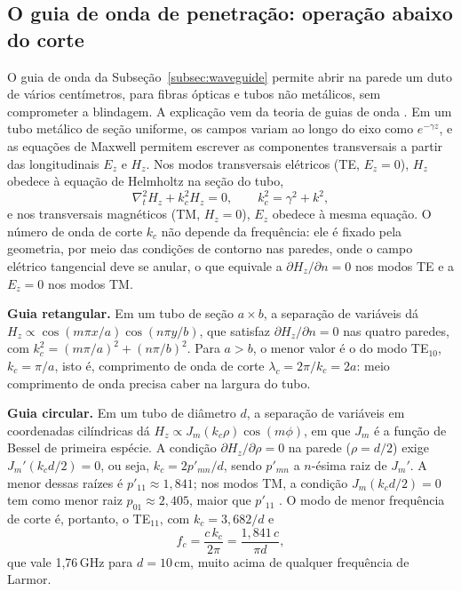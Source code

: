 \documentclass[portuguese]{sbcreviews-2025}%
\begin{document}
\subsection{O guia de onda de penetração: operação abaixo do corte}
\label{subsec:guia}

O guia de onda da Subseção~\ref{subsec:waveguide} permite abrir na parede um duto de vários centímetros, para fibras ópticas e tubos não metálicos, sem comprometer a blindagem. A explicação vem da teoria de guias de onda \citep{pozar2012}. Em um tubo metálico de seção uniforme, os campos variam ao longo do eixo como $e^{-\gamma z}$, e as equações de Maxwell permitem escrever as componentes transversais a partir das longitudinais $E_z$ e $H_z$. Nos modos transversais elétricos (TE, $E_z = 0$), $H_z$ obedece à equação de Helmholtz na seção do tubo,
\begin{equation}
\nabla_t^2 H_z + k_c^2 H_z = 0, \qquad k_c^2 = \gamma^2 + k^2,
\label{eq:helmholtz}
\end{equation}
e nos transversais magnéticos (TM, $H_z = 0$), $E_z$ obedece à mesma equação. O número de onda de corte $k_c$ não depende da frequência: ele é fixado pela geometria, por meio das condições de contorno nas paredes, onde o campo elétrico tangencial deve se anular, o que equivale a $\partial H_z/\partial n = 0$ nos modos TE e a $E_z = 0$ nos modos TM.

\textbf{Guia retangular.} Em um tubo de seção $a \times b$, a separação de variáveis dá $H_z \propto \cos(m\pi x/a)\cos(n\pi y/b)$, que satisfaz $\partial H_z/\partial n = 0$ nas quatro paredes, com $k_c^2 = (m\pi/a)^2 + (n\pi/b)^2$. Para $a > b$, o menor valor é o do modo TE$_{10}$, $k_c = \pi/a$, isto é, comprimento de onda de corte $\lambda_c = 2\pi/k_c = 2a$: meio comprimento de onda precisa caber na largura do tubo.

\textbf{Guia circular.} Em um tubo de diâmetro $d$, a separação de variáveis em coordenadas cilíndricas dá $H_z \propto J_m(k_c\rho)\cos(m\phi)$, em que $J_m$ é a função de Bessel de primeira espécie. A condição $\partial H_z/\partial\rho = 0$ na parede ($\rho = d/2$) exige $J_m'(k_c d/2) = 0$, ou seja, $k_c = 2p'_{mn}/d$, sendo $p'_{mn}$ a $n$-ésima raiz de $J_m'$. A menor dessas raízes é $p'_{11} \approx 1{,}841$; nos modos TM, a condição $J_m(k_c d/2) = 0$ tem como menor raiz $p_{01} \approx 2{,}405$, maior que $p'_{11}$ \citep{pozar2012}. O modo de menor frequência de corte é, portanto, o TE$_{11}$, com $k_c = 3{,}682/d$ e
\begin{equation}
f_c = \frac{c\,k_c}{2\pi} = \frac{1{,}841\,c}{\pi d},
\label{eq:fc}
\end{equation}
que vale 1,76\,GHz para $d = 10$\,cm, muito acima de qualquer frequência de Larmor.
\end{document}

